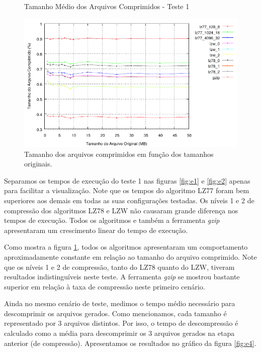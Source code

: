 \documentclass[]{article}
\newcommand{\figref}[1]{figura \ref{#1}}
\begin{document}
\begin{figure}
	{\centering Tamanho Médio dos Arquivos Comprimidos - Teste 1\par}
	\includegraphics{images/natural_taxa}
\caption{Tamanho dos arquivos comprimidos em função dos tamanhos originais.}
\label{fig:e3}
\end{figure}

Separamos os tempos de execução do teste 1 nas figuras \ref{fig:e1} e \ref{fig:e2} apenas para facilitar a visualização. Note que os tempos do algoritmo LZ77 foram bem superiores aos demais em todas as suas configurações testadas. Os níveis 1 e 2 de compressão dos algoritmos LZ78 e LZW não causaram grande diferença nos tempos de execução. Todos os algoritmos e também a ferramenta \textit{gzip} apresentaram um crescimento linear do tempo de execução.

Como mostra a \figref{fig:e3}, todos os algoritmos apresentaram um comportamento aproximadamente constante em relação ao tamanho do arquivo comprimido. Note que os níveis 1 e 2 de compressão, tanto do LZ78 quanto do LZW, tiveram resultados indistinguíveis neste teste. A ferramenta \textit{gzip} se mostrou bastante superior em relação à taxa de compressão neste primeiro cenário.

Ainda no mesmo cenário de teste, medimos o tempo médio necessário para descomprimir os arquivos gerados. Como mencionamos, cada tamanho é representado por 3 arquivos distintos. Por isso, o tempo de descompressão é calculado como a média para descomprimir os 3 arquivos gerados na etapa anterior (de compressão). Apresentamos os resultados no gráfico da \figref{fig:e4}.
\end{document}
